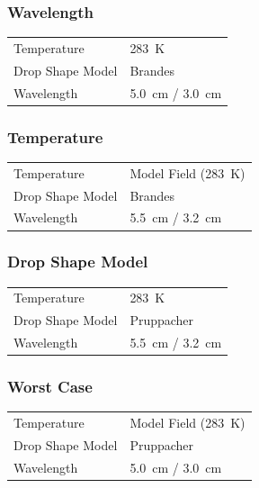 \documentclass[red]{beamer}
\begin{document}
\begin{frame}
	\frametitle{Wavelength}
	\begin{center}
	    \begin{tabular}{ | l | l | }
	        \hline
	        Temperature & \SI{283}{\kelvin} \\
	        Drop Shape Model & Brandes \\
	        Wavelength & \SI{5.0}{\centi\meter} / \SI{3.0}{\centi\meter} \\
			\hline
	    \end{tabular}
	\end{center}	
\end{frame}

\begin{frame}
	\frametitle{Temperature}
	\begin{center}
	    \begin{tabular}{ | l | l | }
	        \hline
	        Temperature & Model Field (\SI{283}{\kelvin}) \\
	        Drop Shape Model & Brandes \\
	        Wavelength & \SI{5.5}{\centi\meter} / \SI{3.2}{\centi\meter} \\
			\hline
	    \end{tabular}
	\end{center}	
\end{frame}

\begin{frame}
	\frametitle{Drop Shape Model}
	\begin{center}
	    \begin{tabular}{ | l | l | }
	        \hline
	        Temperature & \SI{283}{\kelvin} \\
	        Drop Shape Model & Pruppacher \\
	        Wavelength & \SI{5.5}{\centi\meter} / \SI{3.2}{\centi\meter} \\
			\hline
	    \end{tabular}
	\end{center}	
\end{frame}


\begin{frame}
	\frametitle{Worst Case}
	\begin{center}
	    \begin{tabular}{ | l | l | }
	        \hline
	        Temperature & Model Field (\SI{283}{\kelvin}) \\
	        Drop Shape Model & Pruppacher \\
	        Wavelength & \SI{5.0}{\centi\meter} / \SI{3.0}{\centi\meter} \\
			\hline
	    \end{tabular}
	\end{center}	
\end{frame}
\end{document}
